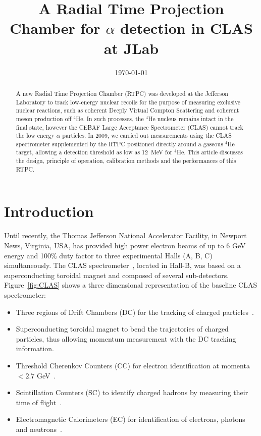 \documentclass[preprint,5p]{elsarticle}
\begin{document}
\title{\vspace{-15mm}\fontsize{24pt}{10pt}\selectfont\textbf{A Radial Time 
Projection Chamber for $\alpha$ detection in CLAS at JLab}}
  

\date{\today}

\begin{abstract}
A new Radial Time Projection Chamber (RTPC) was developed at the Jefferson 
Laboratory to track low-energy nuclear recoils for the purpose of measuring
exclusive nuclear reactions, such as coherent Deeply Virtual Compton Scattering
and coherent meson production off $^4$He. In such processes, the $^4$He nucleus
remains intact in the final state, however the CEBAF Large
Acceptance Spectrometer (CLAS) cannot track the low energy $\alpha$ particles. In
2009, we carried out measurements using the CLAS spectrometer supplemented by
the RTPC positioned directly around a gaseous $^4$He target, allowing a detection
threshold as low as 12~MeV for $^4$He. This article discusses the design,
principle of operation, calibration methods and the performances of this RTPC.
\end{abstract}

\maketitle

\section{Introduction} \label{sec:level1}

Until recently, the Thomas Jefferson National Accelerator Facility, in 
Newport News, Virginia, USA, has provided high power electron beams of 
up to 6 GeV energy and 100$\%$ duty factor to three experimental Halls (A, B, C) 
simultaneously. The CLAS spectrometer~\cite{CLASref}, located
in Hall-B, was based on a superconducting toroidal magnet and composed of 
several sub-detectors. Figure~\ref{fig:CLAS} shows a three dimensional 
representation of the baseline CLAS spectrometer:
\begin{itemize}
 \item Three regions of Drift Chambers (DC) for the tracking of charged 
       particles~\cite{DCref}.
 \item Superconducting toroidal magnet to bend the trajectories 
       of charged particles, thus allowing momentum measurement with the DC tracking information.
 \item Threshold Cherenkov Counters (CC) for electron identification at momenta 
       $<2.7$ GeV~\cite{CCref}.
 \item Scintillation Counters (SC) to identify charged hadrons by measuring their 
       time of flight~\cite{TOFref}.
 \item Electromagnetic Calorimeters (EC) for identification of electrons, 
       photons and neutrons~\cite{ECref}.
\end{itemize}
\end{document}
